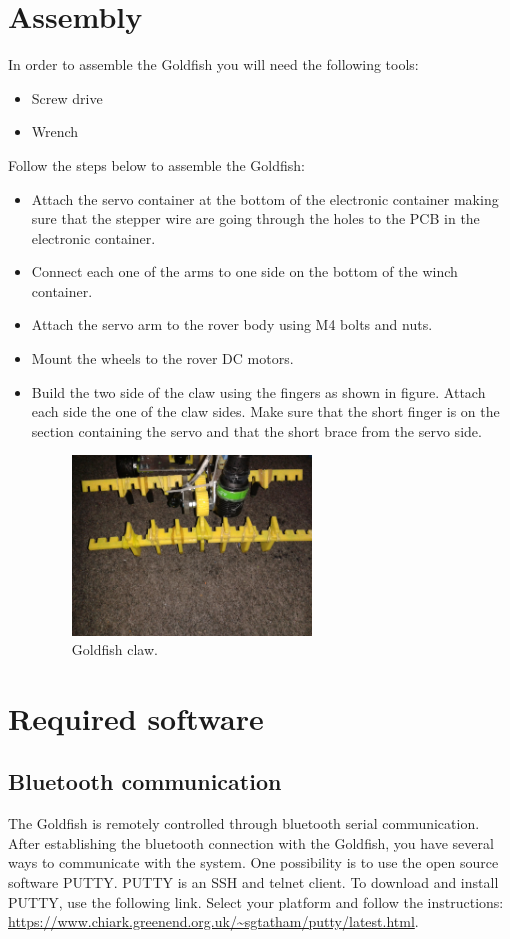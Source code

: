 \documentclass[letterpaper, 12 pt]{article}
\begin{document}
\section{Assembly}
In order to assemble the Goldfish you will need the following tools:
\begin{itemize}
\item Screw drive
\item Wrench
\end{itemize}
Follow the steps below to assemble the Goldfish:
\begin{itemize}
\item Attach the servo container at the bottom of the electronic container making sure that the stepper wire are going through the holes to the PCB in the electronic container.
\item Connect each one of the arms to one side on the bottom of the winch container.
\item Attach the servo arm to the rover body using M4 bolts and nuts.
\item Mount the wheels to the rover DC motors.
\item Build the two side of the claw using the fingers as shown in figure. Attach each side the one of the claw sides. Make sure that the short finger is on the section containing the servo and that the short brace from the servo side.

\begin{figure}[H]
  \caption{Goldfish claw.}
  \centering
    \includegraphics[width=0.6\textwidth]{20170529_053601}
\end{figure}
\end{itemize}
\section{Required software}
\subsection{Bluetooth communication}
The Goldfish is remotely controlled through bluetooth serial communication. After establishing the bluetooth connection with the Goldfish, you have several ways to communicate with the system. One possibility is to use the open source software PUTTY. PUTTY is an SSH and telnet client. To download and install PUTTY, use the following link. Select your platform and follow the instructions:
\url{https://www.chiark.greenend.org.uk/~sgtatham/putty/latest.html}.
\end{document}
